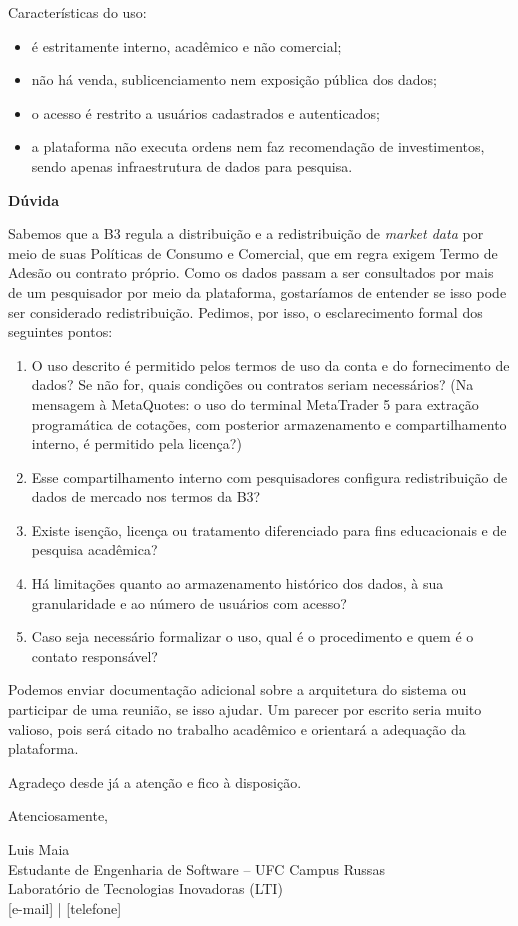 \begin{anexosenv}
\begin{framed}
Características do uso:
\begin{itemize}
    \item é estritamente interno, acadêmico e não comercial;
    \item não há venda, sublicenciamento nem exposição pública dos dados;
    \item o acesso é restrito a usuários cadastrados e autenticados;
    \item a plataforma não executa ordens nem faz recomendação de investimentos, sendo apenas infraestrutura de dados para pesquisa.
\end{itemize}

\noindent\textbf{Dúvida}

Sabemos que a B3 regula a distribuição e a redistribuição de \textit{market data} por meio de suas Políticas de Consumo e Comercial, que em regra exigem Termo de Adesão ou contrato próprio. Como os dados passam a ser consultados por mais de um pesquisador por meio da plataforma, gostaríamos de entender se isso pode ser considerado redistribuição. Pedimos, por isso, o esclarecimento formal dos seguintes pontos:
\begin{enumerate}
    \item O uso descrito é permitido pelos termos de uso da conta e do fornecimento de dados? Se não for, quais condições ou contratos seriam necessários? (Na mensagem à MetaQuotes: o uso do terminal MetaTrader 5 para extração programática de cotações, com posterior armazenamento e compartilhamento interno, é permitido pela licença?)
    \item Esse compartilhamento interno com pesquisadores configura redistribuição de dados de mercado nos termos da B3?
    \item Existe isenção, licença ou tratamento diferenciado para fins educacionais e de pesquisa acadêmica?
    \item Há limitações quanto ao armazenamento histórico dos dados, à sua granularidade e ao número de usuários com acesso?
    \item Caso seja necessário formalizar o uso, qual é o procedimento e quem é o contato responsável?
\end{enumerate}

Podemos enviar documentação adicional sobre a arquitetura do sistema ou participar de uma reunião, se isso ajudar. Um parecer por escrito seria muito valioso, pois será citado no trabalho acadêmico e orientará a adequação da plataforma.

Agradeço desde já a atenção e fico à disposição.

\vspace{1em}
\noindent Atenciosamente,

\noindent Luis Maia\\
Estudante de Engenharia de Software -- UFC Campus Russas\\
Laboratório de Tecnologias Inovadoras (LTI)\\
{[e-mail]} | {[telefone]}

\end{framed}

\end{anexosenv}
